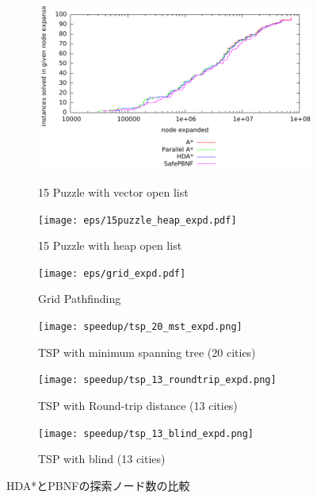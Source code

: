 \documentclass{jsarticle}
\begin{document}
\begin{figure}
	\centering
	\begin{subfigure}{0.6\columnwidth}
		\includegraphics[width=\columnwidth]{eps/15puzzle_vector_expd.pdf}
		\label{fig:15puzzle_vector_expd}
		\caption{15 Puzzle with vector open list}
	\end{subfigure}

	\begin{subfigure}{0.6\columnwidth}
		\texttt{[image: eps/15puzzle\_heap\_expd.pdf]}
		\label{fig:15puzzle_vector_expd}
		\caption{15 Puzzle with heap open list}
	\end{subfigure}

	\begin{subfigure}{0.6\columnwidth}
		\texttt{[image: eps/grid\_expd.pdf]}
		\label{fig:grid_expd}
		\caption{Grid Pathfinding}
	\end{subfigure}

	\begin{subfigure}{0.6\columnwidth}
		\texttt{[image: speedup/tsp\_20\_mst\_expd.png]}
		\label{fig:tsp_20_mst_expd}
		\caption{TSP with minimum spanning tree (20 cities)}
	\end{subfigure}

	\begin{subfigure}{0.6\columnwidth}
		\texttt{[image: speedup/tsp\_13\_roundtrip\_expd.png]}
		\label{fig:tsp_13_round_expd}
		\caption{TSP with Round-trip distance (13 cities)}
	\end{subfigure}

	\begin{subfigure}{0.6\columnwidth}
		\texttt{[image: speedup/tsp\_13\_blind\_expd.png]}
		\label{fig:tsp_13_blind_expd}
		\caption{TSP with blind (13 cities)}
	\end{subfigure}
	\label{fig:comparison}
	\caption{HDA*とPBNFの探索ノード数の比較}
\end{figure}%
\end{document}
